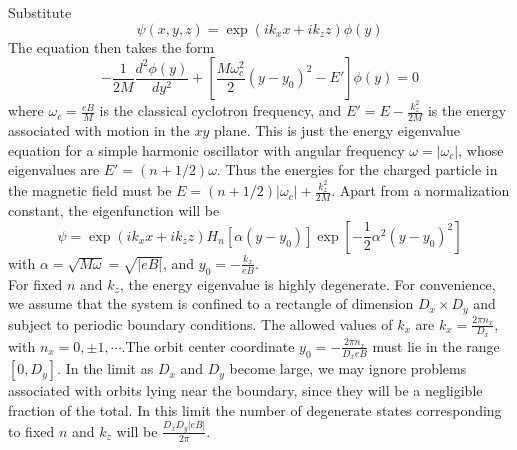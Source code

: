 Substitute
\[\psi(x,y,z) = \exp(ik_xx+ik_zz)\phi(y)\]
The equation then takes the form
\[-\frac{1}{2M} \frac{d^2\phi(y)}{dy^2} + \left[ \frac{M\omega_c^2}{2}(y-y_0)^2-E' \right]\phi(y) = 0\]
where $\omega_c = \frac{eB}{M}$ is the classical cyclotron frequency, and $E'=E-\frac{k_z^2}{2M}$ is the energy associated with motion in the $xy$ plane. This is just the energy eigenvalue equation for a simple harmonic oscillator with angular frequency $\omega = |\omega_c|$, whose eigenvalues are $E' = (n+1/2)\omega$. Thus the energies for the charged particle in the magnetic field must be $E = (n+1/2)|\omega_c|+\frac{k_z^2}{2M}$. Apart from a normalization constant, the eigenfunction will be
\[\psi = \exp(ik_xx+ik_zz) H_n[\alpha(y-y_0)]\exp[-\frac{1}{2}\alpha^2 (y-y_0)^2]\]
with $\alpha = \sqrt{M\omega} = \sqrt{|eB|}$, and $y_0 = - \frac{k_x}{eB}$.\\
For fixed $n$ and $k_z$, the energy eigenvalue is highly degenerate. For convenience, we assume that the system is confined to a rectangle of dimension $D_x\times D_y$ and subject to periodic boundary conditions. The allowed
values of $k_x$ are $k_x = \frac{2\pi n_x}{D_x}$, with $n_x = 0,\pm1,\cdots$.The orbit center coordinate $y_0 = -\frac{2\pi n_x}{D_xeB}$ must lie in the range $[0,D_y]$. In the limit as $D_x$ and $D_y$ become large, we may ignore problems associated with orbits lying near the boundary, since they will be a negligible fraction of the total. In this limit the number of degenerate states corresponding to fixed $n$ and $k_z$ will be $\frac{D_xD_y |eB|}{2\pi}$.

